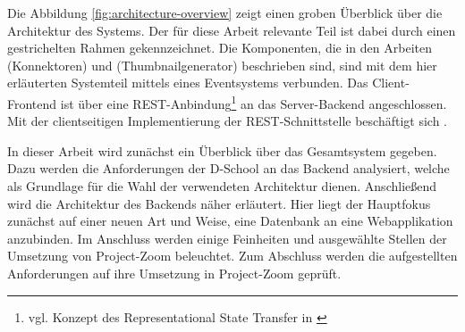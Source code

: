 Die Abbildung \ref{fig:architecture-overview} zeigt einen groben Überblick über die Architektur des Systems. Der für diese Arbeit relevante Teil ist dabei durch einen gestrichelten Rahmen gekennzeichnet. Die Komponenten, die in den Arbeiten \cite{bp-tewe} (\gls{Konnektor}en) und \cite{bp-dome} (Thumbnailgenerator) beschrieben sind, sind mit dem hier erläuterten Systemteil mittels eines \gls{Eventsystem}s verbunden. Das Client-\gls{Frontend} ist über eine REST-Anbindung\footnote{vgl. Konzept des Representational State Transfer in \cite{rest}} an das Server-\gls{Backend} angeschlossen. Mit der clientseitigen Implementierung der REST-Schnittstelle beschäftigt sich \cite{bp-norman}.

In dieser Arbeit wird zunächst ein Überblick über das Gesamtsystem gegeben. Dazu werden die Anforderungen der D-School an das \gls{Backend} analysiert, welche als Grundlage für die Wahl der verwendeten Architektur dienen. Anschließend wird die Architektur des \gls{Backend}s näher erläutert. Hier liegt der Hauptfokus zunächst auf einer neuen Art und Weise, eine Datenbank an eine Webapplikation anzubinden. Im Anschluss werden einige Feinheiten und ausgewählte Stellen der Umsetzung von Project-Zoom beleuchtet. Zum Abschluss werden die aufgestellten Anforderungen auf ihre Umsetzung in Project-Zoom geprüft.